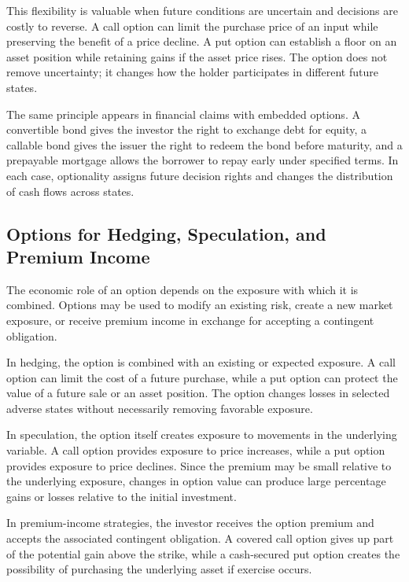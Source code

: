 This flexibility is valuable when future conditions are uncertain and decisions are costly to reverse. A call option can limit the purchase price of an input while preserving the benefit of a price decline. A put option can establish a floor on an asset position while retaining gains if the asset price rises. The option does not remove uncertainty; it changes how the holder participates in different future states.

The same principle appears in financial claims with embedded options. A convertible bond gives the investor the right to exchange debt for equity, a callable bond gives the issuer the right to redeem the bond before maturity, and a prepayable mortgage allows the borrower to repay early under specified terms. In each case, optionality assigns future decision rights and changes the distribution of cash flows across states.

\subsection[Options for Hedging, Speculation, and Premium Income]{Options for Hedging, Speculation, and Premium Income}

The economic role of an option depends on the exposure with which it is combined. Options may be used to modify an existing risk, create a new market exposure, or receive premium income in exchange for accepting a contingent obligation.

In hedging, the option is combined with an existing or expected exposure. A call option can limit the cost of a future purchase, while a put option can protect the value of a future sale or an asset position. The option changes losses in selected adverse states without necessarily removing favorable exposure.

In speculation, the option itself creates exposure to movements in the underlying variable. A call option provides exposure to price increases, while a put option provides exposure to price declines. Since the premium may be small relative to the underlying exposure, changes in option value can produce large percentage gains or losses relative to the initial investment.

In premium-income strategies, the investor receives the option premium and accepts the associated contingent obligation. A covered call option gives up part of the potential gain above the strike, while a cash-secured put option creates the possibility of purchasing the underlying asset if exercise occurs.

